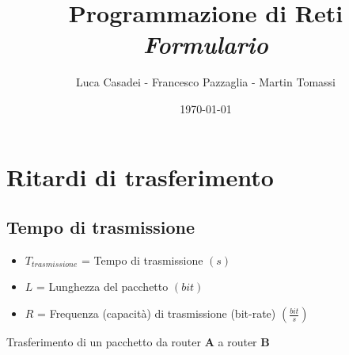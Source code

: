 \documentclass[a4paper]{report}
\title{\textbf{Programmazione di Reti} \\ \textit{Formulario}}
\author{Luca Casadei - Francesco Pazzaglia - Martin Tomassi}
\date{\today}
\begin{document}
	\maketitle
	\tableofcontents
	\chapter{Ritardi di trasferimento}
	\section{Tempo di trasmissione}
	\begin{itemize}
		\item $T_{\textit{trasmissione}}$ = Tempo di trasmissione $(s)$
		\item $L$ = Lunghezza del pacchetto $(bit)$ \label{st:hlen}
		\item $R$ = Frequenza (capacità) di trasmissione (bit-rate) $(\frac{bit}{s})$ \label{it:capacity}
	\end{itemize}
	Trasferimento di un pacchetto da router \textbf{A} a router \textbf{B}\\\\
\end{document}

